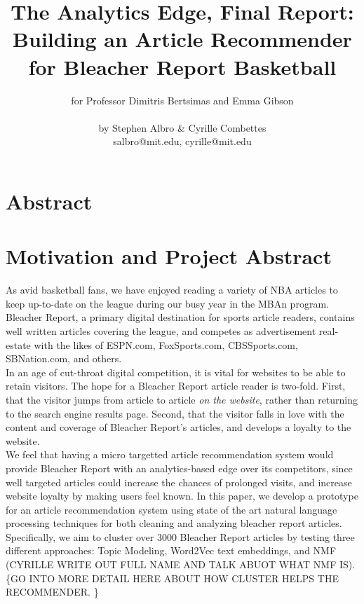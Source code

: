 \documentclass[11pt]{article}
\title{The Analytics Edge, Final Report:\\ Building an Article Recommender for Bleacher Report Basketball}
\author{for Professor Dimitris Bertsimas and Emma Gibson \text{ } \\ \\ by Stephen Albro \& Cyrille Combettes \\ salbro@mit.edu, cyrille@mit.edu}
\begin{document}
\maketitle{}


\section{Abstract}

\section{Motivation and Project Abstract}
As avid basketball fans, we have enjoyed reading a variety of NBA articles to keep up-to-date on the league during our busy year in the MBAn program.  Bleacher Report, a primary digital destination for sports article readers, contains well written articles covering the league, and competes as advertisement real-estate with the likes of ESPN.com, FoxSports.com, CBSSports.com, SBNation.com, and others. \\

  In an age of cut-throat digital competition, it is vital for websites to be able to retain visitors. The hope for a Bleacher Report article reader is two-fold. First, that the visitor jumps from article to article \textit{on the website}, rather than returning to the search engine results page.  Second, that the visitor falls in love with the content and coverage of Bleacher Report's articles, and develops a loyalty to the website. \\

We feel that having a micro targetted article recommendation system would provide Bleacher Report with an analytics-based edge over its competitors, since well targeted articles could increase the chances of prolonged visits, and increase website loyalty by making users feel known.  In this paper, we develop a prototype for an article recommendation system using state of the art natural language processing techniques for both cleaning and analyzing bleacher report articles.  Specifically, we aim to cluster over 3000 Bleacher Report articles by testing three different approaches: Topic Modeling, Word2Vec text embeddings, and NMF (CYRILLE WRITE OUT FULL NAME AND TALK ABUOT WHAT NMF IS).  \{GO INTO MORE DETAIL HERE ABOUT HOW CLUSTER HELPS THE RECOMMENDER. \}

\end{document}
